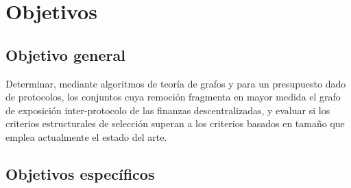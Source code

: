 \documentclass[journal]{IEEEtran}
\begin{document}
\section{Objetivos}

\subsection{Objetivo general}

Determinar, mediante algoritmos de teoría de grafos y para un presupuesto dado
de protocolos, los conjuntos cuya remoción fragmenta en mayor medida el grafo de
exposición inter-protocolo de las finanzas descentralizadas, y evaluar si los
criterios estructurales de selección superan a los criterios basados en tamaño
que emplea actualmente el estado del arte.

\subsection{Objetivos específicos}
\end{document}
